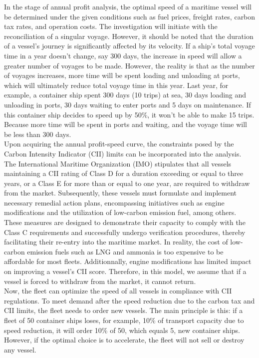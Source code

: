 \documentclass[a4paper,12pt]{article}
\begin{document}
In the stage of annual profit analysis, the optimal speed of a maritime vessel will be determined under the given conditions such as fuel prices, freight rates, carbon tax rates, and operation costs.
The investigation will initiate with the reconciliation of a singular voyage.
However, it should be noted that the duration of a vessel's journey is significantly affected by its velocity.
If a ship's total voyage time in a year doesn't change, say 300 days, the increase in speed will allow a greater number of voyages to be made.
However, the reality is that as the number of voyages increases, more time will be spent loading and unloading at ports, which will ultimately reduce total voyage time in this year.
Last year, for example, a container ship spent 300 days (10 trips) at sea, 30 days loading and unloading in ports, 30 days waiting to enter ports and 5 days on maintenance.
If this container ship decides to speed up by 50\%, it won't be able to make 15 trips.
Because more time will be spent in ports and waiting, and the voyage time will be less than 300 days. \\

Upon acquiring the annual profit-speed curve, the constraints posed by the Carbon Intensity Indicator (CII) limits can be incorporated into the analysis.
The International Maritime Organization (IMO) stipulates that all vessels maintaining a CII rating of Class D for a duration exceeding or equal to three years, or a Class E for more than or equal to one year, are required to withdraw from the market.
Subsequently, these vessels must formulate and implement necessary remedial action plans, encompassing initiatives such as engine modifications and the utilization of low-carbon emission fuel, among others.
These measures are designed to demonstrate their capacity to comply with the Class C requirements and successfully undergo verification procedures, thereby facilitating their re-entry into the maritime market.
In reality, the cost of low-carbon emission fuels such as LNG and ammonia is too expensive to be affordable for most fleets.
Additionnally, engine modifications has limited impact on improving a vessel's CII score.
Therefore, in this model, we assume that if a vessel is forced to withdraw from the market, it cannot return.\\

Now, the fleet can optimize the speed of all vessels in compliance with CII regulations.
To meet demand after the speed reduction due to the carbon tax and CII limits, the fleet needs to order new vessels.
The main principle is this: if a fleet of 50 container ships loses, for example, 10\% of transport capacity due to speed reduction, it will order 10\% of 50, which equals 5, new container ships.
However, if the optimal choice is to accelerate, the fleet will not sell or destroy any vessel.\\
\end{document}
